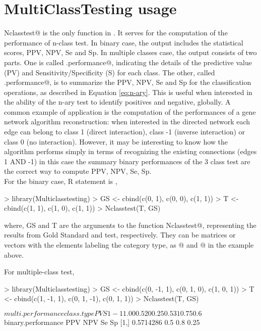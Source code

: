 \documentclass{article}
\begin{document}
\section{MultiClassTesting usage}

\verb@ Nclasstest@ is the only function in \verb@Multiclasstesting@. It serves for the computation of the performance of n-class test.  In binary case, the output includes the statistical scores, PPV, NPV, Se and Sp. In multiple classes case, the output consists of two parts. One is called \verb@multi.performance@, indicating the details of the predictive value (PV) and Sensitivity/Specificity (S) for each class. The other, called \verb@binary.performance@, is to summarize the PPV, NPV, Se and Sp for the classification operations, as described in Equation \ref{eq:n-ary}. 
This is useful when interested in the ability of the n-ary test to identify positives and negative, globally. A common example of application is the computation of the performances of a gene network algorithm reconstruction: when interested in the directed
network each edge can belong to class 1 (direct interaction), class -1 (inverse interaction) or class 0 (no interaction). However, it may be interesting to know how the algorithm performs simply in terms of recognizing the existing connections (edges 1 AND -1) in this case the summary binary performances of the 3 class test are the correct way to compute PPV, NPV, Se, Sp.\\
For the binary case, R statement is , 
\begin{Schunk}
\begin{Sinput}
> library(Multiclasstesting)
> GS <- cbind(c(0, 1), c(0, 0), c(1, 1))
> T <- cbind(c(1, 1), c(1, 0), c(1, 1))
> Nclasstest(T, GS)
\end{Sinput}
\end{Schunk}
where, GS and T are the arguments to the function \verb@ Nclasstest@, representing the results from Gold Standard and test, respectively. They can be matrices or vectors with the elements labeling the category type, as  @ and @ in the example above. 


For multiple-class test, 
\begin{Schunk}
\begin{Sinput}
> library(Multiclasstesting)
> GS <- cbind(c(0, -1, 1), c(0, 1, 0), c(1, 0, 1))
> T <- cbind(c(1, -1, 1), c(0, 1, -1), c(0, 1, 1))
> Nclasstest(T, GS)
\end{Sinput}
\begin{Soutput}
$multi.performance
  class.type   PV   S
1         -1 1.00 0.5
2          0 0.25 0.5
3          1 0.75 0.6

$binary.performance
           PPV NPV  Se   Sp
[1,] 0.5714286 0.5 0.8 0.25
\end{Soutput}
\end{Schunk}
\end{document}
